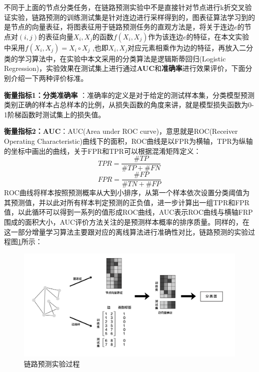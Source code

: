 不同于上面的节点分类任务，在链路预测实验中不是直接针对节点进行k折交叉验证实验，链路预测的训练测试集是针对连边进行采样得到的，图表征算法学习到的是节点的向量表征，将图表征用于链路预测任务的直观方法是，将关于连边$e$的节点对$(i,j)$的表征向量$X_i,X_j$的函数$f(X_i, X_j)$作为该连边$e$的特征，在本文实验中采用$f(X_i, X_j) = X_i\circ X_j$ ,也即$X_i, X_j$对应元素相乘作为边的特征，再放入二分类的学习算法中，在实验中本文采用的分类算法是逻辑斯蒂回归(Logistic Regression)，实验效果在测试集上进行通过\textbf{AUC}和\textbf{准确率}进行效果评价，下面分别介绍一下两种评价标准。

{\textbf{衡量指标1：分类准确率}} ：准确率的定义是对于给定的测试样本集，分类模型预测类别正确的样本占总样本的比例，从损失函数的角度来讲，就是模型损失函数为0-1阶梯函数时测试集上的损失值。

\textbf{衡量指标2：AUC}：AUC(Area under ROC curve)，意思就是ROC(Receiver Operating Characteristic)曲线下的面积，ROC曲线是以FPR为横轴，TPR为纵轴的坐标中画出的曲线，关于FPR和TPR可以根据混淆矩阵定义：
\begin{equation}
	TPR = \frac{\#TP}{\#TP+\#FN}
\end{equation}
\begin{equation}
FPR = \frac{\#FP}{\#TN+\#FP}
\end{equation}
ROC曲线将样本按照预测概率从大到小排序，从第一个样本依次设置分类阈值为其预测值，并以此对所有样本判定预测的正负值，进一步计算出一组TPR和FPR值，以此循环可以得到一系列的值形成ROC曲线，AUC表示ROC曲线与横轴FRP围成的面积大小，AUC评价方法关注的是预测样本概率的排序质量。同样的，在这一部分增量学习算法主要跟对应的离线算法进行准确性对比，链路预测的实验过程图\ref{fig:link_prediction_process}所示：
\begin{figure}
	\centering
	\includegraphics[width=6in]{figures/link_predict_frame}
	\caption{链路预测实验过程}
	\label{fig:link_prediction_process}
\end{figure}

